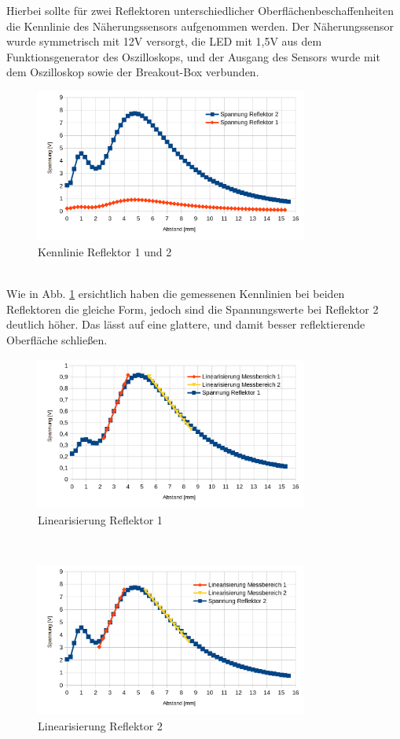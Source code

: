 Hierbei sollte für zwei Reflektoren unterschiedlicher Oberflächenbeschaffenheiten die Kennlinie des Näherungssensors aufgenommen werden. Der Näherungssensor wurde symmetrisch mit 12V versorgt, die LED mit 1,5V aus dem Funktionsgenerator des Oszilloskops, und der Ausgang des Sensors wurde mit dem Oszilloskop sowie der Breakout-Box verbunden.
\begin{figure}[h]
	\centering
	\includegraphics[width=0.8\textwidth]{./img/ch6/Kennlinie_Reflektor_1_und_2}
	\caption{Kennlinie Reflektor 1 und 2}
	\label{fg:kenn_refl}
\end{figure}
~\\
Wie in Abb. \ref{fg:kenn_refl} ersichtlich haben die gemessenen Kennlinien bei beiden Reflektoren die gleiche Form, jedoch sind die Spannungswerte bei Reflektor 2 deutlich höher. Das lässt auf eine glattere, und damit besser reflektierende Oberfläche schließen.
\begin{figure}[h]
	\centering
	\includegraphics[width=0.8\textwidth]{./img/ch6/Linearisierung_Reflektor_1}
	\caption{Linearisierung Reflektor 1}
	\label{fg:kenn_linear1}
\end{figure}
~\\\begin{figure}[h]
	\centering
	\includegraphics[width=0.8\textwidth]{./img/ch6/Linearisierung_Reflektor_2}
	\caption{Linearisierung Reflektor 2}
	\label{fg:kenn_linear2}
\end{figure}
